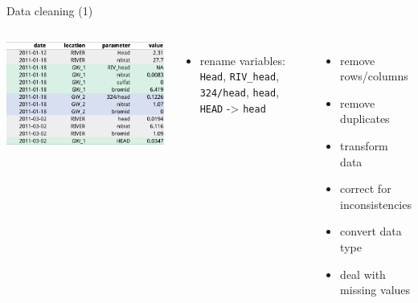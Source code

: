 \documentclass[8pt,ignorenonframetext,]{beamer}
\newenvironment{Shaded}{\begin{snugshade}}{\end{snugshade}}
\newcommand{\KeywordTok}[1]{\textcolor[rgb]{0.13,0.29,0.53}{\textbf{{#1}}}}
\newcommand{\StringTok}[1]{\textcolor[rgb]{0.31,0.60,0.02}{{#1}}}
\newcommand{\NormalTok}[1]{{#1}}
\providecommand{\tightlist}{%
  \setlength{\itemsep}{0pt}\setlength{\parskip}{0pt}}
\newcommand{\columnsbegin}{\begin{columns}}
\newcommand{\columnsend}{\end{columns}}
\begin{document}
\begin{frame}[fragile]{Data cleaning (1)}

\columnsbegin


\includegraphics{imgPres/data_tidying_table_messy_bad.png}

\begin{itemize}
\item
  rename variables: \texttt{Head}, \texttt{RIV\_head},
  \texttt{324/head}, \texttt{head}, \texttt{HEAD} -\textgreater{}
  \texttt{head}

\begin{Shaded}
\end{Shaded}
\end{itemize}


\begin{itemize}
\tightlist
\item
  remove rows/columns
\item
  remove duplicates
\item
  transform data
\item
  correct for inconsistencies
\item
  convert data type
\item
  deal with missing values
\end{itemize}

\columnsend

\end{frame}
\end{document}
